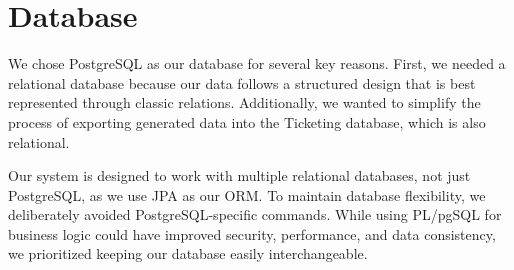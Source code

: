 \section{Database}
We chose PostgreSQL as our database for several key reasons. First, we needed a relational database because our data follows a structured design that is best represented through classic relations. Additionally, we wanted to simplify the process of exporting generated data into the Ticketing database, which is also relational.

Our system is designed to work with multiple relational databases, not just PostgreSQL, as we use JPA as our ORM. To maintain database flexibility, we deliberately avoided PostgreSQL-specific commands. While using PL/pgSQL for business logic could have improved security, performance, and data consistency, we prioritized keeping our database easily interchangeable.


